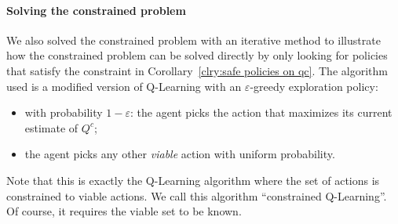 \paragraph{Solving the constrained problem} We also solved the constrained problem with an iterative method to illustrate how the constrained problem can be solved directly by only looking for policies that satisfy the constraint in Corollary~\ref{clry:safe policies on qc}. The algorithm used is a modified version of Q-Learning with an $\varepsilon$-greedy exploration policy:
\begin{itemize}
	\item with probability $1-\varepsilon$: the agent picks the action that maximizes its current estimate of $Q^c$;
	\item the agent picks any other\emph{ viable} action with uniform probability.
\end{itemize}
Note that this is exactly the Q-Learning algorithm where the set of actions is constrained to viable actions. We call this algorithm \enquote{constrained Q-Learning}. Of course, it requires the viable set to be known.

